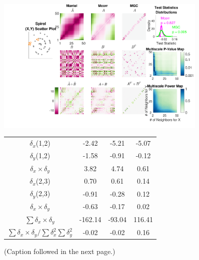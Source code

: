\documentclass[11pt]{article}
\newcommand{\note}[2][]{\added[#1,remark={#2}]{}}
\newcommand{\jv}[1]{{\note{jv: #1}}}
\begin{document}
\begin{figure}[htbp]
\includegraphics[width=0.9\textwidth,trim={5cm 0 0 0},clip]{../Figures/FigA}
\begin{center}
\begin{tabular}{c c c c}
 $\delta_x$(1,2) & \hspace{1.8em} \color{magenta}-2.42 \hspace{1.8em}  & \hspace{1.8em} \color{magenta}-5.21 \hspace{1.8em} & \hspace{1.8em} \color{magenta}-5.07 \hspace{1.8em}  \\ 
 $\delta_y$(1,2) & \color{magenta}-1.58 & \color{magenta}-0.91 & \color{magenta}-0.12  \\ 
 $\delta_x \times \delta_y$ & \color{green}3.82 & \color{green}4.74 & \color{green}0.61  \\ 
 
\hline


 $\delta_x$(2,3) & \color{green}0.70 & \color{green}0.61 & \color{green}0.14  \\ 
 $\delta_y$(2,3) &  \color{magenta}-0.91 & \color{magenta}-0.28 & \color{green}0.12  \\ 
 $\delta_x \times \delta_y$ & \color{magenta}-0.63 & \color{magenta}-0.17 & \color{green}0.02  \\ 

\hline
 $\sum{\delta_x \times \delta_y}$ & \color{magenta}-162.14   & \color{magenta}-93.04 & \color{green}116.41  \\ 
$\sum{\delta_x \times \delta_y} / \sum{\delta_{x}^2}\sum{\delta_{y}^2}$ &  \color{magenta}-0.02  & \color{magenta}-0.02 & \color{green}0.16  \\ 


\end{tabular}
\jv{the figure and table may need to be re-aligned. }
\end{center}
\caption{(Caption followed in the next page.)}
\label{f:schematic}
\end{figure}
\end{document}
